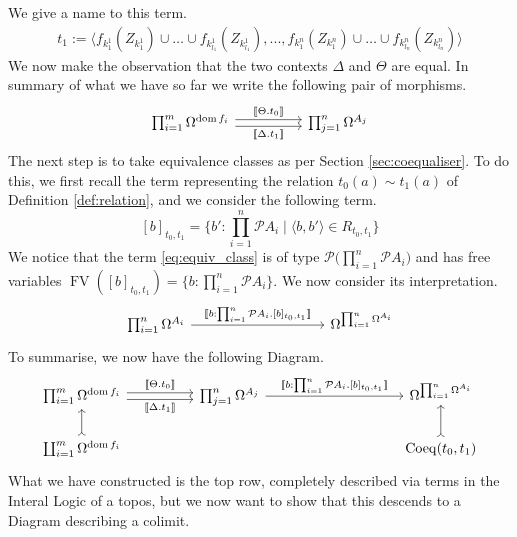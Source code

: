 \documentclass{tac}
\newcommand{\call}[1]{\mathcal{#1}}
\begin{document}
	We give a name to this term.
	\begin{align*}
		t_1 := \langle f_{k_1^1}(Z_{k_1^1}) \cup \hdots \cup f_{k_{l_1}^1}(Z_{k_{l_1}^1}),...,f_{k_1^n}(Z_{k_1^n}) \cup \hdots \cup f_{k_{l_n}^n}(Z_{k_{l_n}^n})\rangle
	\end{align*}
	We now make the observation that the two contexts $\Delta$ and $\Theta$ are equal. In summary of what we have so far we write the following pair of morphisms.
	\begin{equation}
		\begin{tikzcd}
			\prod_{i = 1}^m \Omega^{\operatorname{dom}f_i}\arrow[rr,shift left, "{\llbracket\Theta.  t_0\rrbracket}"]\arrow[rr,swap,shift right,"{\llbracket \Delta. t_1\rrbracket}"] & & \prod_{j = 1}^n\Omega^{A_j} 
		\end{tikzcd}
	\end{equation}
	The next step is to take equivalence classes as per Section \ref{sec:coequaliser}. To do this, we first recall the term representing the relation $t_0(a) \sim t_1(a)$ of Definition \ref{def:relation}, and we consider the following term.
	\begin{equation}\label{eq:equiv_class}
		[b]_{t_0,t_1} = \Big\lbrace b':\prod_{i = 1}^n \call{P}A_i \mid \langle b,b'\rangle \in R_{t_0,t_1}\Big\rbrace
	\end{equation}
	We notice that the term \eqref{eq:equiv_class} is of type $\call{P}\big(\prod_{i = 1}^n \call{P}A_i\big)$ and has free variables $\operatorname{FV}([b]_{t_0,t_1}) = \lbrace b: \prod_{i = 1}^n \call{P}A_i\rbrace$. We now consider its interpretation.
	\begin{equation}
		\begin{tikzcd}[column sep = huge]
			\prod_{i =1 }^n \Omega^{A_i}\arrow[rr,"{\llbracket b:\prod_{i = 1}^n \call{P}A_i. [b]_{t_0,t_1} \rrbracket}"] & & \Omega^{\prod_{i = 1}^n \Omega^{A_i}}
		\end{tikzcd}
	\end{equation}
	To summarise, we now have the following Diagram.
	\begin{equation}\label{eq:colimit_parent}
		\begin{tikzcd}[column sep = huge]
			\prod_{i = 1}^m \Omega^{\operatorname{dom}f_i}\arrow[r,shift left, "{\llbracket\Theta.  t_0 \rrbracket}"]\arrow[r,swap,shift right,"{\llbracket \Delta. t_1\rrbracket}"]& \prod_{j = 1}^n\Omega^{A_j} \arrow[rr,"{\llbracket b:\prod_{i = 1}^n \call{P}A_i. [b]_{t_0,t_1} \rrbracket}"] & & \Omega^{\prod_{i = 1}^n \Omega^{A_i}}\\
			\coprod_{i = 1}^m \Omega^{\operatorname{dom}f_i}\arrow[u,rightarrowtail] & & & \operatorname{Coeq}(t_0,t_1)\arrow[u,rightarrowtail]
		\end{tikzcd}
	\end{equation}
	What we have constructed is the top row, completely described via terms in the Interal Logic of a topos, but we now want to show that this descends to a Diagram describing a colimit.
	
\end{document}
